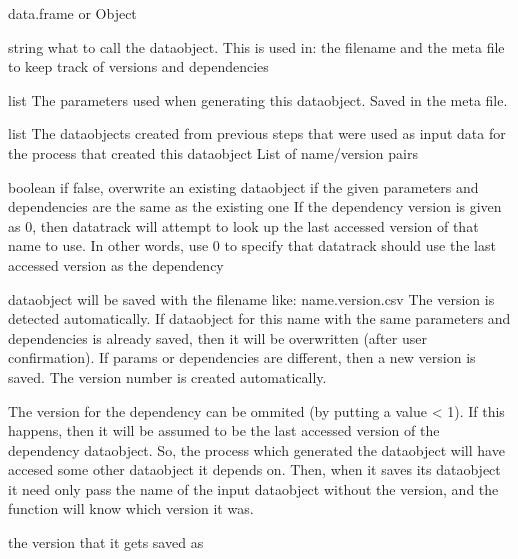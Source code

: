 \documentclass[a4paper]{book}
\begin{document}
\begin{Arguments}
\begin{ldescription}
\item[\code{x}] data.frame or Object

\item[\code{name}] string what to call the dataobject. This is used in: the filename and the meta file to keep track of versions and dependencies

\item[\code{params}] list The parameters used when generating this dataobject. Saved in the meta file.

\item[\code{dependencies}] list The dataobjects created from previous steps that were used as input data for the process that created this dataobject List of name/version pairs

\item[\code{check.before.overwrite}] boolean if false, overwrite an existing dataobject if the given parameters and dependencies are the same as the existing one
If the dependency version is given as 0, then datatrack will attempt to look up the last accessed version of that name to use. In other words, use 0 to
specify that datatrack should use the last accessed version as the dependency
\end{ldescription}
\end{Arguments}
%
\begin{Details}\relax
dataobject will be saved with the filename like: name.version.csv  The version is detected automatically.
If dataobject for this name with the same parameters and dependencies is already saved, then it will be overwritten (after user confirmation).
If params or dependencies are different, then a new version is saved. The version number is created automatically.

The version for the dependency can be ommited (by putting a value < 1). If this happens, then it will be assumed to be the last accessed version
of the dependency dataobject. So, the process which generated the dataobject will have accesed some other dataobject it depends on. Then, when it saves its dataobject
it need only pass the name of the input dataobject without the version, and the function will know which version it was.
\end{Details}
%
\begin{Value}
the version that it gets saved as
\end{Value}
\end{document}
